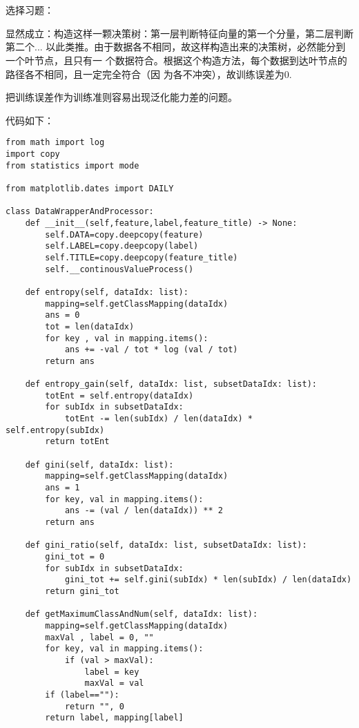 \documentclass{ctexart}
\newcounter{answercnt}
\newcommand{\sCourse}{机器学习}   %
\newcommand{\nTime}{4}             %
\newcommand{\sName}{黄昊}           %
\newcommand{\sNumber}{20204205}     %
\newcommand{\homeworkTitle}{
    \setcounter{answercnt}{0}
    \begin{center}
        \fontsize{16pt}{0}{\textbf{\kaishu\sCourse课程\quad第\nTime次作业}}\\
        \fontsize{13pt}{0}{\textit{\kaishu\sName\qquad\sNumber}}\\
    \end{center}}
\begin{document}
\homeworkTitle
选择习题：\answer[4.1]\answer[4.2]\answer[4.3]\answer[4.4]\answer[4.8]

\answer[4.1]
显然成立：构造这样一颗决策树：第一层判断特征向量的第一个分量，第二层判断第二个...
以此类推。由于数据各不相同，故这样构造出来的决策树，必然能分到一个叶节点，且只有一
个数据符合。根据这个构造方法，每个数据到达叶节点的路径各不相同，且一定完全符合（因
为各不冲突），故训练误差为0.

\answer[4.2]
把训练误差作为训练准则容易出现泛化能力差的问题。

\answer[4.3]
\answer[4.4]
代码如下：
\begin{lstlisting}
from math import log
import copy
from statistics import mode

from matplotlib.dates import DAILY

class DataWrapperAndProcessor:
    def __init__(self,feature,label,feature_title) -> None:
        self.DATA=copy.deepcopy(feature)
        self.LABEL=copy.deepcopy(label)
        self.TITLE=copy.deepcopy(feature_title)
        self.__continousValueProcess()
    
    def entropy(self, dataIdx: list):
        mapping=self.getClassMapping(dataIdx)
        ans = 0
        tot = len(dataIdx)
        for key , val in mapping.items():
            ans += -val / tot * log (val / tot)
        return ans
    
    def entropy_gain(self, dataIdx: list, subsetDataIdx: list):
        totEnt = self.entropy(dataIdx)
        for subIdx in subsetDataIdx:
            totEnt -= len(subIdx) / len(dataIdx) * self.entropy(subIdx)
        return totEnt
    
    def gini(self, dataIdx: list):
        mapping=self.getClassMapping(dataIdx)
        ans = 1
        for key, val in mapping.items():
            ans -= (val / len(dataIdx)) ** 2
        return ans
    
    def gini_ratio(self, dataIdx: list, subsetDataIdx: list):
        gini_tot = 0
        for subIdx in subsetDataIdx:
            gini_tot += self.gini(subIdx) * len(subIdx) / len(dataIdx)
        return gini_tot
    
    def getMaximumClassAndNum(self, dataIdx: list):
        mapping=self.getClassMapping(dataIdx)
        maxVal , label = 0, ""
        for key, val in mapping.items():
            if (val > maxVal):
                label = key
                maxVal = val
        if (label==""):
            return "", 0
        return label, mapping[label]        
    

\end{lstlisting}
\end{document}

